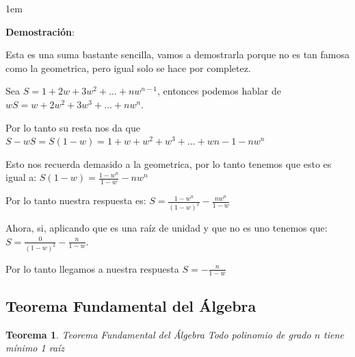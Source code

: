 \documentclass[12pt, fleqn]{report}                             %
\newenvironment{SmallIndentation}[1][0.75em]                    %
    {\begin{adjustwidth}{#1}{}\begin{footnotesize}}                 %
    {\end{footnotesize}\end{adjustwidth}}                           %
\newtheorem{Theorem}{Teorema}[section]                          %
\begin{document}
\begin{itemize}
                        \begin{SmallIndentation}[1em]
                            \textbf{Demostración}:

                            Esta es una suma bastante sencilla, vamos a demostrarla porque no es tan famosa como
                            la geometrica, pero igual solo se hace por completez.

                            Sea $S = 1 + 2w + 3w^2 + \dots + nw^{n-1}$, entonces podemos hablar de 
                            $wS = w + 2w^2 + 3w^3 + \dots + nw^n$.

                            Por lo tanto su resta nos da que 
                            $S-wS = S(1-w) = 1+w+w^2+w^3+\dots+w{n-1}-nw^n$

                            Esto nos recuerda demasido a la geometrica, por lo tanto tenemos que esto es igual a:
                            $S(1-w) = \frac{1-w^n}{1-w} - nw^n$

                            Por lo tanto nuestra respuesta es:
                            $S = \frac{1-w^n}{(1-w)^2} - \frac{nw^n}{1-w}$

                            Ahora, si, aplicando que es una raíz de unidad y que no es uno tenemos que:
                            $S = \frac{0}{(1-w)^2} - \frac{n}{1-w}$.

                            Por lo tanto llegamos a nuestra respuesta $S = - \frac{n}{1-w}$

                        \end{SmallIndentation}
                  
                \end{itemize}



            \subsection{Teorema Fundamental del Álgebra}

                \begin{Theorem}{Teorema Fundamental del Álgebra}
                    Todo polinomio de grado $n$ tiene mínimo 1 raíz
                \end{Theorem}
\end{document}
